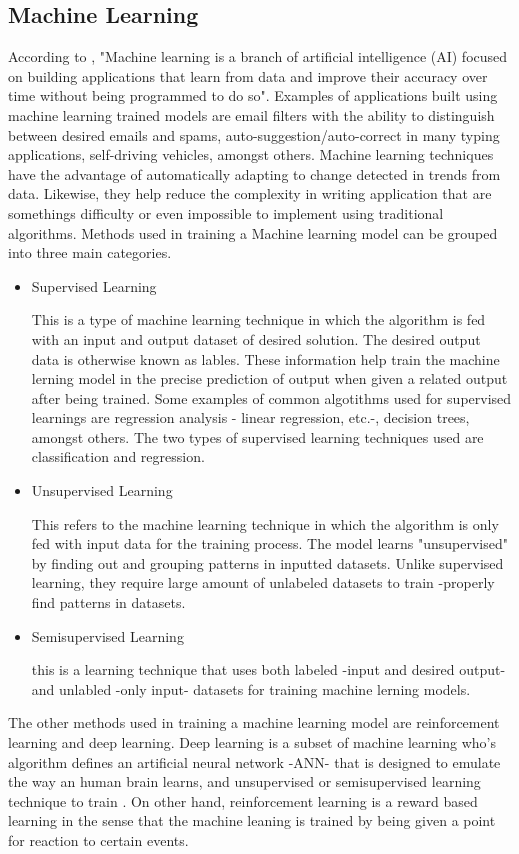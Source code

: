 \documentclass[conference]{IEEEtran}
\begin{document}
\subsection{Machine Learning}
According to \cite{ibm_cloud_education_2020}, "Machine learning is a branch of artificial intelligence (AI) focused on building applications that learn from data and improve their accuracy over time without being programmed to do so". Examples of applications built using machine learning trained models are email filters with the ability to distinguish between desired emails and spams, auto-suggestion/auto-correct in many typing applications, self-driving vehicles, amongst others. Machine learning techniques have the advantage of automatically adapting to change detected in trends from data. Likewise, they help reduce the complexity in writing application that are somethings difficulty or even impossible to implement using traditional algorithms. Methods used in training a Machine learning model can be grouped into three main categories.

	\begin{itemize}
		\item Supervised Learning
		
		This is a type of machine learning technique in which the algorithm is fed with an input and output dataset of desired solution. The desired output data is otherwise known as lables. These information help train the machine lerning model in the precise prediction of output when given a related output after being trained. Some examples of common algotithms used for supervised learnings are regression analysis - linear regression, etc.-, decision trees, amongst others.\cite{theobald2017machine} The two types of supervised learning techniques used are classification and regression.
		\item Unsupervised Learning
		
		This refers to the machine learning technique in which the algorithm is only fed with input data for the training process. The model learns "unsupervised" by finding out and grouping patterns in inputted datasets. Unlike supervised learning, they require large amount of unlabeled datasets to train -properly find patterns in datasets.
		\item Semisupervised Learning
		
		this is a learning technique that uses both labeled -input and desired output- and unlabled -only input- datasets for training machine lerning models.
	\end{itemize}
The other methods used in training a machine learning model are reinforcement learning and deep learning. Deep learning is a subset of machine learning who's algorithm defines an artificial neural network -ANN- that is designed to emulate the way an human brain learns, and unsupervised or semisupervised learning technique to train \cite{ibm_cloud_education_2020}. On other hand, reinforcement learning is a reward based learning in the sense that the machine leaning is trained by being given a point for reaction to certain events.
\end{document}
